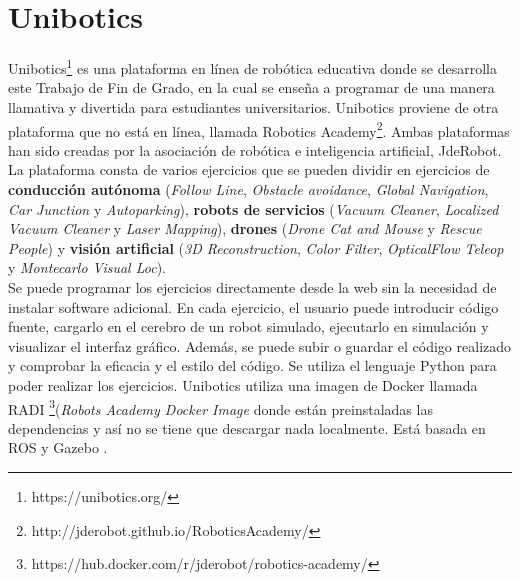 \section{Unibotics}

Unibotics\footnote{https://unibotics.org/} es una plataforma en línea de robótica educativa donde se desarrolla este Trabajo de Fin de Grado, en la cual se enseña a programar de una manera llamativa y divertida para estudiantes universitarios. Unibotics proviene de otra plataforma que no está en línea, llamada Robotics Academy\footnote{http://jderobot.github.io/RoboticsAcademy/}. Ambas plataformas han sido creadas por la asociación de robótica e inteligencia artificial, JdeRobot.\\

\newpage
La plataforma consta de varios ejercicios que se pueden dividir en ejercicios de \textbf{conducción autónoma} (\textit{Follow Line}, \textit{Obstacle avoidance}, \textit{Global Navigation}, \textit{Car Junction} y \textit{Autoparking}), \textbf{robots de servicios }(\textit{Vacuum Cleaner}, \textit{Localized Vacuum Cleaner} y \textit{Laser Mapping}), \textbf{drones} (\textit{Drone Cat and Mouse} y \textit{Rescue People}) y \textbf{visión artificial} (\textit{3D Reconstruction}, \textit{Color Filter}, \textit{OpticalFlow Teleop} y \textit{Montecarlo Visual Loc}).\\

Se puede programar los ejercicios directamente desde la web sin la necesidad de instalar software adicional. En cada ejercicio, el usuario puede introducir código fuente, cargarlo en el cerebro de un robot simulado, ejecutarlo en simulación y visualizar el interfaz gráﬁco. Además, se puede subir o guardar el código realizado y comprobar la eficacia y el estilo del código. Se utiliza el lenguaje Python para poder realizar los ejercicios. Unibotics utiliza una imagen de Docker llamada RADI \footnote{https://hub.docker.com/r/jderobot/robotics-academy/}(\textit{Robots Academy Docker Image} donde están preinstaladas las dependencias y así no se tiene que descargar nada localmente. Está basada en ROS y Gazebo \cite{robotics}.\\

